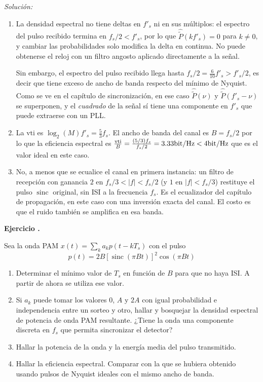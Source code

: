 \documentclass[a4paper,11pt]{article}
\DeclareMathOperator{\sinc}{sinc}
\newcounter{numejer}[section]
\newenvironment{ejercicio}[1][]{
\refstepcounter{numejer}
\noindent \large \textbf{Ejercicio \arabic{section}.\arabic{numejer}} \ifthenelse{\equal{#1}{}}{}{\emph{(#1)}}

\smallskip
}{
\bigskip
}
\newenvironment{solucion}[1][]{
\noindent \large \textsl{Solución:} \ifthenelse{\equal{#1}{}}{}{\emph{(#1)}}

\smallskip
}{
\bigskip
}
\begin{document}
\begin{solucion}
\begin{enumerate}
                \item La densidad espectral no tiene deltas en $f'_s$ ni en sus múltiplos: el espectro del pulso recibido termina en $f_s/2<f'_s$, por lo que $\hat{\tilde P}(kf'_s)=0$ para $k\neq0$, y cambiar las probabilidades solo modifica la delta en continua. No puede obtenerse el reloj con un filtro angosto aplicado directamente a la señal.

                Sin embargo, el espectro del pulso recibido llega hasta $f_s/2=\frac{6}{10}f'_s>f'_s/2$, es decir que tiene exceso de ancho de banda respecto del mínimo de Nyquist. Como se ve en el capítulo de sincronización, en ese caso $\hat{\tilde P}(\nu)$ y $\hat{\tilde P}(f'_s-\nu)$ se superponen, y el \emph{cuadrado} de la señal sí tiene una componente en $f'_s$ que puede extraerse con un PLL.
                
                \item La $\textrm{vti}$ es $\log_2(M) f'_s = \frac{5}{3} f_s$. El ancho de banda del canal es $B=f_s/2$ por lo que la eficiencia espectral es $\frac{\textrm{vti}}{B} = \frac{(5/3)f_s}{f_s/2} = 3.33 \unit{\bit/\hertz} < 4 \unit{\bit/\hertz}$ que es el valor ideal en este caso.
                
                \item No, a menos que se ecualice el canal en primera instancia: un filtro de recepción con ganancia $2$ en $f_s/3<|f|<f_s/2$ (y $1$ en $|f|<f_s/3$) restituye el pulso $\sinc$ original, sin ISI a la frecuencia $f_s$. Es el ecualizador del capítulo de propagación, en este caso con una inversión exacta del canal. El costo es que el ruido también se amplifica en esa banda.
        \end{enumerate}
\end{solucion}



\begin{ejercicio}
Sea la onda PAM $x(t)=\sum_k a_k p(t-k T_s)$ con el pulso
\begin{equation*}
        p(t) = 2B \left[ \sinc(\pi B t) \right]^2 \cos( \pi B t )       
\end{equation*}

\begin{enumerate}
\item Determinar el mínimo valor de $T_s$ en función de $B$ para que no haya ISI. A partir de ahora se utiliza ese valor.
\item Si $a_k$ puede tomar los valores $0$, $A$ y $2A$ con igual probabilidad e independencia entre un sorteo y otro, hallar y bosquejar la densidad espectral de potencia de onda PAM resultante. ¿Tiene la onda una componente discreta en $f_s$ que permita sincronizar el detector?
\item Hallar la potencia de la onda y la energía media del pulso transmitido.
\item Hallar la eficiencia espectral. Comparar con la que se hubiera obtenido usando pulsos de Nyquist ideales con el mismo ancho de banda.
\end{enumerate}
\end{ejercicio}
\end{document}
